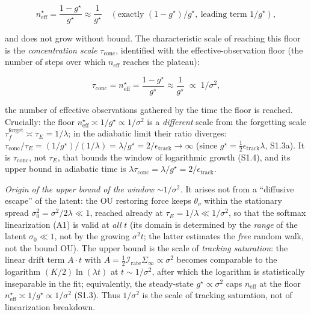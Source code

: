 \documentclass[12pt]{iopart}
\begin{document}
\begin{equation}n_{\text{eff}}^\star = \frac{1-g^\star}{g^\star} \approx \frac{1}{g^\star} \quad (\text{exactly } (1-g^\star)/g^\star,\ \text{leading term } 1/g^\star), \tag{S1.3b}\end{equation}



and does not grow without bound. The characteristic scale of reaching this floor is the \emph{concentration scale} \(\tau_{\text{conc}}\), identified with the effective-observation floor (the number of steps over which \(n_{\text{eff}}\) reaches the plateau):



\begin{equation}\tau_{\text{conc}} = n_{\text{eff}}^\star = \frac{1-g^\star}{g^\star} \approx \frac{1}{g^\star} \;\propto\; 1/\sigma^2, \tag{S1.3c}\end{equation}



the number of effective observations gathered by the time the floor is reached. Crucially: the floor \(n_{\text{eff}}^\star \asymp 1/g^\star \propto 1/\sigma^2\) is a \emph{different} scale from the forgetting scale \(\tau_f^{\text{forget}} \asymp \tau_E = 1/\lambda\); in the adiabatic limit their ratio diverges: \(\tau_{\text{conc}}/\tau_E = (1/g^\star)/(1/\lambda) = \lambda/g^\star = 2/\epsilon_{\text{track}} \to \infty\) (since \(g^\star = \tfrac12\epsilon_{\text{track}}\lambda\), S1.3a). It is \(\tau_{\text{conc}}\), not \(\tau_E\), that bounds the window of logarithmic growth (S1.4), and its upper bound in adiabatic time is \(\lambda\tau_{\text{conc}} = \lambda/g^\star = 2/\epsilon_{\text{track}}\).



\emph{Origin of the upper bound of the window \(\sim 1/\sigma^2\).} It arises not from a ``diffusive escape'' of the latent: the OU restoring force keeps \(\theta_v\) within the stationary spread \(\sigma_0^2 = \sigma^2/2\lambda \ll 1\), reached already at \(\tau_E = 1/\lambda \ll 1/\sigma^2\), so that the softmax linearization (A1) is valid at \emph{all} \(t\) (its domain is determined by the \emph{range} of the latent \(\sigma_0 \ll 1\), not by the growing \(\sigma^2 t\); the latter estimates the \emph{free} random walk, not the bound OU). The upper bound is the scale of \emph{tracking saturation}: the linear drift term \(A\cdot t\) with \(A = \tfrac12\mathcal I_{\text{rate}}\Sigma_\infty \propto \sigma^2\) becomes comparable to the logarithm \((K/2)\ln(\lambda t)\) at \(t \sim 1/\sigma^2\), after which the logarithm is statistically inseparable in the fit; equivalently, the steady-state \(g^\star \propto \sigma^2\) caps \(n_{\text{eff}}\) at the floor \(n_{\text{eff}}^\star \asymp 1/g^\star \propto 1/\sigma^2\) (S1.3). Thus \(1/\sigma^2\) is the scale of tracking saturation, not of linearization breakdown.
\end{document}
